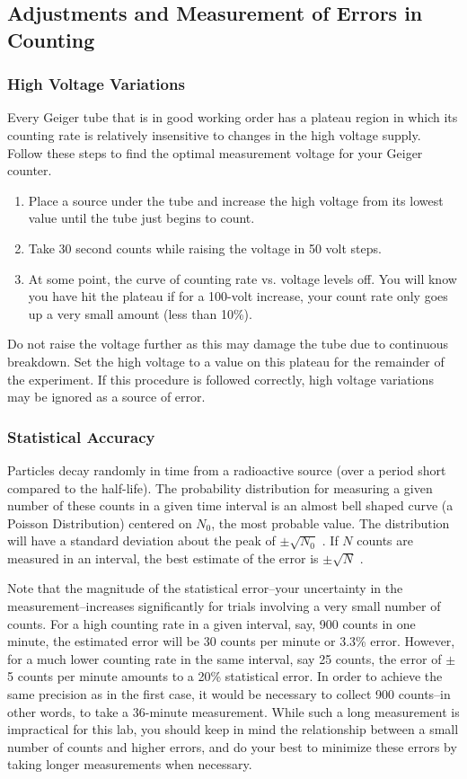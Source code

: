 \subsection{Adjustments and Measurement of Errors in Counting}
\subsubsection{High Voltage Variations}

Every Geiger tube that is in good working order has a plateau region in which its counting rate is relatively insensitive to changes in the high voltage supply. Follow these steps to find the optimal measurement voltage for your Geiger counter.
\begin{enumerate}
  \item Place a source under the tube and increase the high voltage from its lowest value until the tube just begins to count.
  \item Take 30 second counts while raising the voltage in 50 volt steps.
  \item At some point, the curve of counting rate vs. voltage levels off. You will know you have hit the plateau if for a 100-volt increase, your count rate only goes up a very small amount (less than 10\%).
\end{enumerate}
Do not raise the voltage further as this may damage the tube due to continuous breakdown. Set the high voltage to a value on this plateau for the remainder of the experiment. If this procedure is followed correctly, high voltage variations may be ignored as a source of error.

\subsubsection{Statistical Accuracy}

Particles decay randomly in time from a radioactive source (over a period short compared to the half-life). The probability distribution for measuring a given number of these counts in a given time interval is an almost bell shaped curve (a Poisson Distribution) centered on $N_0$, the most probable value. The distribution will have a standard deviation about the peak of $\pm \sqrt{N_{0}}$ . If $N$ counts are measured in an interval, the best estimate of the error is $\pm \sqrt{N}$ .\myskip

Note that the magnitude of the statistical error--your uncertainty in the measurement--increases significantly for trials involving a very small number of counts. For a high counting rate in a given interval, say, 900 counts in one minute, the estimated error will be 30 counts per minute or 3.3\% error. However, for a much lower counting rate in the same interval, say 25 counts, the error of $\pm$5 counts per minute amounts to a 20\% statistical error. In order to achieve the same precision as in the first case, it would be necessary to collect 900 counts--in other words, to take a 36-minute measurement. While such a long measurement is impractical for this lab, you should keep in mind the relationship between a small number of counts and higher errors, and do your best to minimize these errors by taking longer measurements when necessary.

